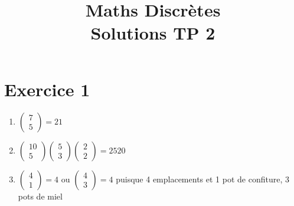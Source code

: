 \documentclass[fontsize=10pt]{article}
\title{\textbf{Maths Discrètes }\\Solutions TP 2 }
\date{}
\begin{document}
\maketitle %


\section*{Exercice 1}
\begin{enumerate}
\item $\begin{pmatrix}
7 \\ 5
\end{pmatrix} = 21$
\item $\begin{pmatrix} 
10\\
5
\end{pmatrix}
\begin{pmatrix} 
5\\
3
\end{pmatrix}
\begin{pmatrix} 
2\\
2
\end{pmatrix} = 2520$
\item $ 
\begin{pmatrix} 
4\\
1
\end{pmatrix} = 4$ ou $
\begin{pmatrix} 
4\\
3
\end{pmatrix} =4$ puisque 4 emplacements et 1 pot de confiture, 3 pots de miel
\end{enumerate}
\end{document}
